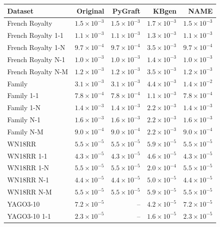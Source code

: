 \begin{tabular}{lrrrr}
\toprule
Dataset & Original & PyGraft & KBgen & NAME \\
\midrule
French Royalty & $1.5\times10^{-3}$ & $1.5\times10^{-3}$ & $1.7\times10^{-3}$ & $1.5\times10^{-3}$ \\
French Royalty 1-1 & $1.1\times10^{-3}$ & $1.1\times10^{-3}$ & $1.3\times10^{-3}$ & $1.1\times10^{-3}$ \\
French Royalty 1-N & $9.7\times10^{-4}$ & $9.7\times10^{-4}$ & $3.5\times10^{-3}$ & $9.7\times10^{-4}$ \\
French Royalty N-1 & $1.0\times10^{-3}$ & $1.0\times10^{-3}$ & $1.4\times10^{-3}$ & $1.0\times10^{-3}$ \\
French Royalty N-M & $1.2\times10^{-3}$ & $1.2\times10^{-3}$ & $3.5\times10^{-3}$ & $1.2\times10^{-3}$ \\
\midrule
Family & $3.1\times10^{-3}$ & $3.1\times10^{-3}$ & $4.4\times10^{-3}$ & $1.4\times10^{-2}$ \\
Family 1-1 & $7.8\times10^{-4}$ & $7.8\times10^{-4}$ & $1.1\times10^{-3}$ & $7.8\times10^{-4}$ \\
Family 1-N & $1.4\times10^{-3}$ & $1.4\times10^{-3}$ & $2.2\times10^{-3}$ & $1.4\times10^{-3}$ \\
Family N-1 & $1.6\times10^{-3}$ & $1.6\times10^{-3}$ & $2.2\times10^{-3}$ & $1.6\times10^{-3}$ \\
Family N-M & $9.0\times10^{-4}$ & $9.0\times10^{-4}$ & $2.2\times10^{-3}$ & $9.0\times10^{-4}$ \\
\midrule
WN18RR & $5.5\times10^{-5}$ & $5.5\times10^{-5}$ & $5.9\times10^{-5}$ & $5.5\times10^{-5}$ \\
WN18RR 1-1 & $4.3\times10^{-5}$ & $4.3\times10^{-5}$ & $4.6\times10^{-5}$ & $4.3\times10^{-5}$ \\
WN18RR 1-N & $5.5\times10^{-5}$ & $5.5\times10^{-5}$ & $2.0\times10^{-4}$ & $5.5\times10^{-5}$ \\
WN18RR N-1 & $4.4\times10^{-5}$ & $4.4\times10^{-5}$ & $5.0\times10^{-5}$ & $4.4\times10^{-5}$ \\
WN18RR N-M & $5.5\times10^{-5}$ & $5.5\times10^{-5}$ & $5.9\times10^{-5}$ & $5.5\times10^{-5}$ \\
\midrule
YAGO3-10 & $7.2\times10^{-5}$ & – & $4.2\times10^{-5}$ & $7.2\times10^{-5}$ \\
YAGO3-10 1-1 & $2.3\times10^{-5}$ & – & $1.6\times10^{-5}$ & $2.3\times10^{-5}$ \\

\end{tabular}
